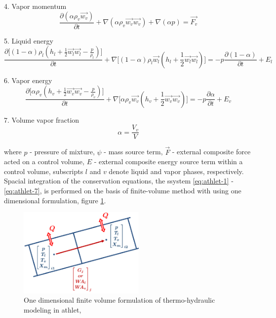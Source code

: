 4. Vapor momentum
\begin{equation} \label{eq:athlet-4}
\frac{\partial (\alpha \rho_{v} \vec{w_{v}})}{\partial t} + \nabla (\alpha \rho_{v} \vec{w_{v}} \vec{w_{v}}) + \nabla (\alpha p) = \vec{F_{v}}
\end{equation}


5. Liquid energy
\begin{equation} \label{eq:athlet-5}
\frac{\partial \Big[ (1-\alpha)\rho_{l}(h_{l} + \frac{1}{2} \vec{w_{l}} \vec{w_{l}} - \frac{p}{\rho_{l}}) \Big]}{\partial t} + \nabla \Big[ (1-\alpha)\rho_{l}\vec{w_{l}}(h_{l} + \frac{1}{2} \vec{w_{l}} \vec{w_{l}}) \Big] = - p \frac{\partial (1 - \alpha)}{\partial t} + E_{l}
\end{equation}


6. Vapor energy
\begin{equation} \label{eq:athlet-6}
\frac{\partial \Big[ \alpha \rho_{v}(h_{v} + \frac{1}{2} \vec{w_{v}} \vec{w_{v}} - \frac{p}{\rho_{v}}) \Big]}{\partial t} + \nabla \Big[ \alpha\rho_{v}\vec{w_{v}}(h_{v} + \frac{1}{2} \vec{w_{v}} \vec{w_{v}}) \Big] = - p \frac{\partial \alpha}{\partial t} + E_{v}
\end{equation}

7. Volume vapor fraction
\begin{equation} \label{eq:athlet-7}
	\alpha = \frac{V_{v}}{V}
\end{equation}


where $p$ - pressure of mixture, $\psi$ - mass source term, $\vec{F}$ - external composite force acted on a control volume, $E$ - external composite energy source term within a control volume, subscripts $l$ and $v$ denote liquid and vapor phases, respectively. \\


Spacial integration of the conservation equations, the ssystem \ref{eq:athlet-1} - \ref{eq:athlet-7}, is performed on the basis of finite-volume method with using one dimensional formulation, figure \ref{fig:introduction-1d-fvm}.


\figpointer{\ref{fig:introduction-1d-fvm}}
\begin{figure}[htpb]
  \centering
  \includegraphics[width=0.55\textwidth]{figures/introduction-1d-fvm.png}
\caption{One dimensional finite volume formulation of thermo-hydraulic modeling in \gls{athlet}, \cite{tims-presentation}}
\label{fig:introduction-1d-fvm}
\end{figure}


